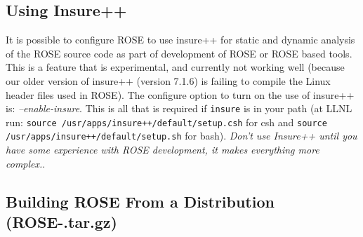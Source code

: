 \subsection{Using Insure++}
\label{gettingStarted:insure}

   It is possible to configure ROSE to use insure++ for static and dynamic analysis
of the ROSE source code as part of development of ROSE or ROSE based tools.  This
is a feature that is experimental, and currently not working well (because our older
version of insure++ (version 7.1.6) is failing to compile the Linux header files used in ROSE).
The configure option to turn on the use of insure++ is: {\em --enable-insure}.
This is all that is required if {\tt insure} is in your path (at LLNL run: 
{\tt source /usr/apps/insure++/default/setup.csh} for csh and 
{\tt source /usr/apps/insure++/default/setup.sh} for bash).  
{\em Don't use Insure++ until you have some experience with ROSE development, it makes everything more complex.}.



\subsection{Building ROSE From a Distribution (ROSE-\VersionNumber.tar.gz)}
\label{gettingStarted:UserInstructions}

